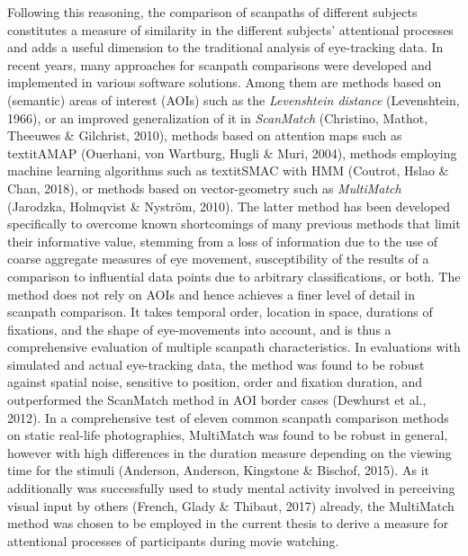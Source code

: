 \documentclass[a4paper, 11pt]{scrreprt}
\begin{document}
Following this reasoning, the comparison of scanpaths of different subjects constitutes a measure of similarity in the different subjects’ attentional processes and adds a useful dimension to the traditional analysis of eye-tracking data. In recent years, many approaches for scanpath comparisons were developed and implemented in various software solutions. Among them are methods based on (semantic) areas of interest (AOIs) such as the \textit{Levenshtein distance} (Levenshtein, 1966), or an improved generalization of it in \textit{ScanMatch} (Christino, Mathot, Theeuwes \& Gilchrist, 2010), methods based on attention maps such as textit{AMAP} (Ouerhani, von Wartburg, Hugli \& Muri, 2004), methods employing machine learning algorithms such as textit{SMAC with HMM} (Coutrot, Hslao \& Chan, 2018), or methods based on vector-geometry such as \textit{MultiMatch} (Jarodzka, Holmqvist \& Nyström, 2010). The latter method has been developed specifically to overcome known shortcomings of many previous methods that limit their informative value, stemming from a loss of information due to the use of coarse aggregate measures of eye movement, susceptibility of the results of a comparison to influential data points due to arbitrary classifications, or both. The method does not rely on AOIs and hence achieves a finer level of detail in scanpath comparison. It takes temporal order, location in space, durations of fixations, and the shape of eye-movements into account, and is thus a comprehensive evaluation of multiple scanpath characteristics. In evaluations with simulated and actual eye-tracking data, the method was found to be robust against spatial noise, sensitive to position, order and fixation duration, and outperformed the ScanMatch method in AOI border cases (Dewhurst et al., 2012). In a comprehensive test of eleven common scanpath comparison methods on static real-life photographies, MultiMatch was found to be robust in general, however with high differences in the duration measure depending on the viewing time for the stimuli (Anderson, Anderson, Kingstone \& Bischof, 2015). As it additionally was successfully used to study mental activity involved in perceiving visual input by others (French, Glady \& Thibaut, 2017) already, the MultiMatch method was chosen to be employed in the current thesis to derive a measure for attentional processes of participants during movie watching. \newline
\end{document}
